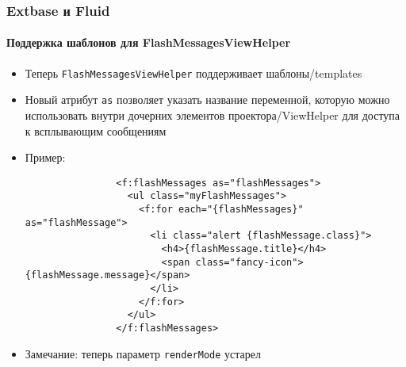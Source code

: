 
\begin{frame}[fragile]
	\frametitle{Extbase и Fluid}
	\framesubtitle{Поддержка шаблонов для FlashMessagesViewHelper}

	\lstset{basicstyle=\tiny\ttfamily}

	\begin{itemize}

		\item Теперь \texttt{FlashMessagesViewHelper} поддерживает шаблоны/templates

		\item Новый атрибут \texttt{as} позволяет указать название переменной, которую можно использовать
			внутри дочерних элементов проектора/ViewHelper для доступа к всплывающим сообщениям

		\item Пример:

			\begin{lstlisting}
				<f:flashMessages as="flashMessages">
				  <ul class="myFlashMessages">
				    <f:for each="{flashMessages}" as="flashMessage">
				      <li class="alert {flashMessage.class}">
				        <h4>{flashMessage.title}</h4>
				        <span class="fancy-icon">{flashMessage.message}</span>
				      </li>
				    </f:for>
				  </ul>
				</f:flashMessages>
			\end{lstlisting}

		\item Замечание: теперь параметр \texttt{renderMode} устарел

	\end{itemize}

\end{frame}


